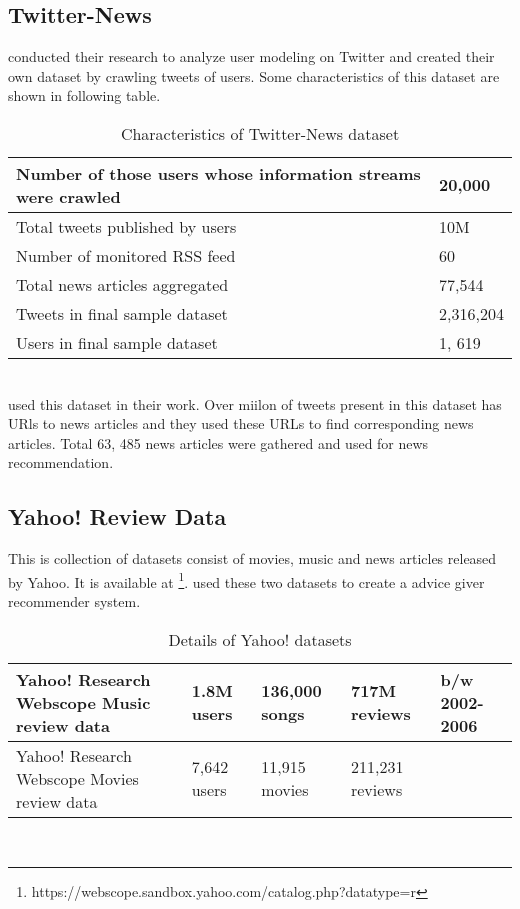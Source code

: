 \subsection{Twitter-News}
\cite{N61} conducted their research to analyze user modeling on Twitter and created their own dataset by crawling tweets of users. Some characteristics of this dataset are shown in following table.
\\
\begin{table}[!htbp] 
\centering
\footnotesize
\def\arraystretch{1.4}%
\centering
\begin{tabular}{|p{8cm}|p{2cm}|}
\hline
Number of those users whose information streams were crawled & 20,000
\\
\hline 
Total tweets published by users & 10M
\\
\hline 
Number of monitored RSS feed & 60
\\
\hline 
Total news articles aggregated & 77,544
\\
\hline 
Tweets in final sample dataset & 2,316,204 
\\
\hline 
Users in final sample dataset & 1, 619
\\
\hline
\end{tabular}

\caption{Characteristics of Twitter-News dataset}
\label{table:14}
\end{table}
\\
\cite{N61} used this dataset in their work. Over miilon of tweets present in this dataset has URls to news articles and they used these URLs to find corresponding news articles. Total 63, 485 news articles were gathered and used for news recommendation. 
\subsection{Yahoo! Review Data}
 This is collection of datasets consist of movies, music and news articles released by Yahoo. It is available at \footnote{https://webscope.sandbox.yahoo.com/catalog.php?datatype=r}. \cite{Yahoo} used these two datasets to create  a advice giver recommender system. 
 \\
\begin{table}[!htbp] 
\centering
\footnotesize
\def\arraystretch{1.4}%
\centering
\begin{tabular}{|p{5cm}|p{1.5cm}|p{1.5cm}|p{1.5cm}|p{2cm}|}
\hline 
Yahoo! Research Webscope Music review data & 1.8M users & 136,000 songs & 717M reviews & b/w 2002-2006
\\
\hline 
Yahoo! Research Webscope Movies review data &  7,642 users & 11,915 movies & 211,231 reviews & 
\\
\hline
\end{tabular}

\caption{Details of Yahoo! datasets}
\label{table:15}
\end{table}
\\
